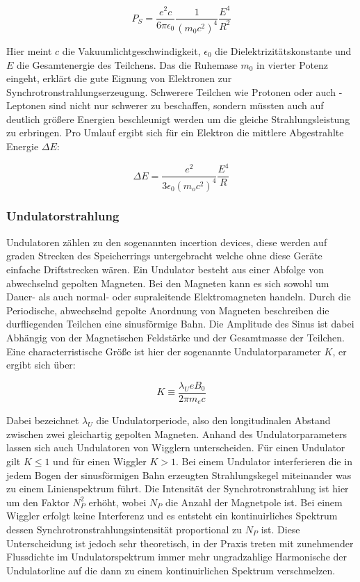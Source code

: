 \begin{equation*}
    P_S = \frac{e^2c}{6\pi \epsilon_0}\frac{1}{(m_0c^2)^4}\frac{E^4}{R^2}
\end{equation*}

Hier meint $c$ die Vakuumlichtgeschwindigkeit, $\epsilon_0$ die Dielektrizitätskonstante 
und $E$ die Gesamtenergie des Teilchens. Das die Ruhemase $m_0$ in vierter Potenz eingeht,
erklärt die gute Eignung von Elektronen zur Synchrotronstrahlungserzeugung. Schwerere 
Teilchen wie Protonen oder auch \tau-Leptonen sind nicht nur schwerer zu beschaffen, sondern
müssten auch auf deutlich größere Energien beschleunigt werden um die gleiche Strahlungsleistung
zu erbringen. Pro Umlauf ergibt sich für ein Elektron die mittlere Abgestrahlte Energie $\Delta E$:

\begin{equation*}
    \Delta E = \frac{e^2}{3\epsilon_0(m_oc^2)^4}\frac{E^4}{R}
\end{equation*}

\subsubsection{Undulatorstrahlung}
\label{sec:Undulatorstrahlung}
Undulatoren zählen zu den sogenannten incertion devices, diese werden auf graden Strecken des 
Speicherrings untergebracht welche ohne diese Geräte einfache Driftstrecken wären. Ein Undulator besteht
aus einer Abfolge von abwechselnd gepolten Magneten. Bei den Magneten kann es sich sowohl um Dauer- als
auch normal- oder supraleitende Elektromagneten handeln. Durch die Periodische, abwechselnd gepolte 
Anordnung von Magneten beschreiben die durfliegenden Teilchen eine sinusförmige Bahn. Die Amplitude des 
Sinus ist dabei Abhängig von der Magnetischen Feldstärke und der Gesamtmasse der Teilchen. Eine 
characterristische Größe ist hier der sogenannte Undulatorparameter $K$, er ergibt sich über:

\begin{equation*}
    K \equiv \frac{\lambda_U e B_0}{2 \pi m_e c}
\end{equation*}

Dabei bezeichnet $\lambda_U$ die Undulatorperiode, also den longitudinalen Abstand zwischen zwei 
gleichartig gepolten Magneten. Anhand des Undulatorparameters lassen sich auch Undulatoren von Wigglern
unterscheiden. Für einen Undulator gilt $K \leq 1$ und für einen Wiggler $K > 1$. Bei einem Undulator 
interferieren die in jedem Bogen der sinusförmigen Bahn erzeugten Strahlungskegel miteinander was zu
einem Linienspektrum führt. Die Intensität der Synchrotronstrahlung ist hier um den Faktor $N_P^2$ 
erhöht, wobei $N_P$ die Anzahl der Magnetpole ist. Bei einem Wiggler erfolgt keine Interferenz und 
es entsteht ein kontinuirliches Spektrum dessen Synchrotronstrahlungsintensität proportional zu $N_P$ ist.
Diese Unterscheidung ist jedoch sehr theoretisch, in der Praxis treten mit zunehmender Flussdichte im 
Undulatorspektrum immer mehr ungradzahlige Harmonische der Undulatorline auf die dann zu einem 
kontinuirlichen Spektrum verschmelzen.




